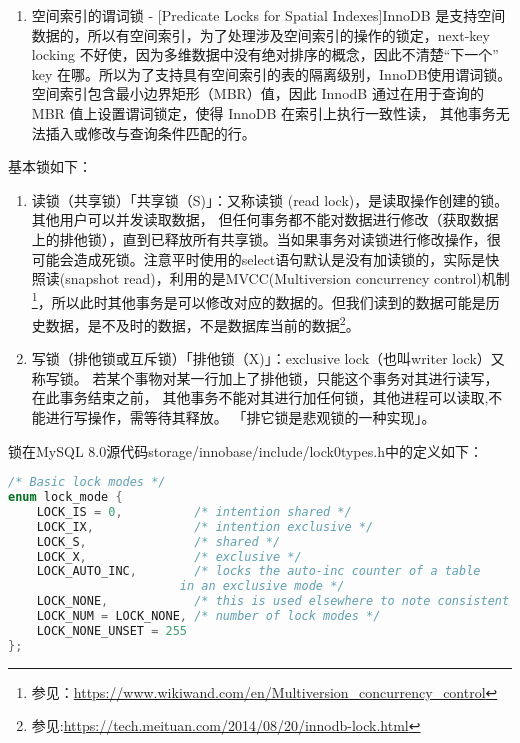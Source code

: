 \documentclass[../../../interview-questions.tex]{subfiles}
\begin{document}
\begin{enumerate}
    0，只用 Auto-Inc Lock。
    1，默认值，对于插入前已知插入行数的插入，用互斥量，对于插入前不知道具体插入数的插入，用 Auto-Inc Lock，这样即使基于 statement -based binlog 复制也是安全的。
    2，只用互斥量。
    \item {空间索引的谓词锁 - [Predicate Locks for Spatial Indexes]}InnoDB 是支持空间数据的，所以有空间索引，为了处理涉及空间索引的操作的锁定，next-key locking 不好使，因为多维数据中没有绝对排序的概念，因此不清楚“下一个” key 在哪。所以为了支持具有空间索引的表的隔离级别，InnoDB使用谓词锁。空间索引包含最小边界矩形（MBR）值，因此 InnodB 通过在用于查询的 MBR 值上设置谓词锁定，使得 InnoDB 在索引上执行一致性读， 其他事务无法插入或修改与查询条件匹配的行。
\end{enumerate}

基本锁如下：

\begin{enumerate}
    \item{读锁（共享锁）}「共享锁（S)」：又称读锁 (read lock)，是读取操作创建的锁。其他用户可以并发读取数据， 但任何事务都不能对数据进行修改（获取数据上的排他锁），直到已释放所有共享锁。当如果事务对读锁进行修改操作，很可能会造成死锁。注意平时使用的select语句默认是没有加读锁的，实际是快照读(snapshot read)，利用的是MVCC(Multiversion concurrency control)机制\footnote{参见：\url{https://www.wikiwand.com/en/Multiversion_concurrency_control}}，所以此时其他事务是可以修改对应的数据的。但我们读到的数据可能是历史数据，是不及时的数据，不是数据库当前的数据\footnote{参见:\url{https://tech.meituan.com/2014/08/20/innodb-lock.html}}。
    \item{写锁（排他锁或互斥锁）}「排他锁（X)」：exclusive lock（也叫writer lock）又称写锁。 若某个事物对某一行加上了排他锁，只能这个事务对其进行读写，在此事务结束之前， 其他事务不能对其进行加任何锁，其他进程可以读取,不能进行写操作，需等待其释放。 「排它锁是悲观锁的一种实现」。
\end{enumerate}

锁在MySQL 8.0源代码storage/innobase/include/lock0types.h中的定义如下：

\begin{lstlisting}[language=C]
/* Basic lock modes */
enum lock_mode {
    LOCK_IS = 0,          /* intention shared */
    LOCK_IX,              /* intention exclusive */
    LOCK_S,               /* shared */
    LOCK_X,               /* exclusive */
    LOCK_AUTO_INC,        /* locks the auto-inc counter of a table
                        in an exclusive mode */
    LOCK_NONE,            /* this is used elsewhere to note consistent read */
    LOCK_NUM = LOCK_NONE, /* number of lock modes */
    LOCK_NONE_UNSET = 255
};
\end{lstlisting}
\end{document}
